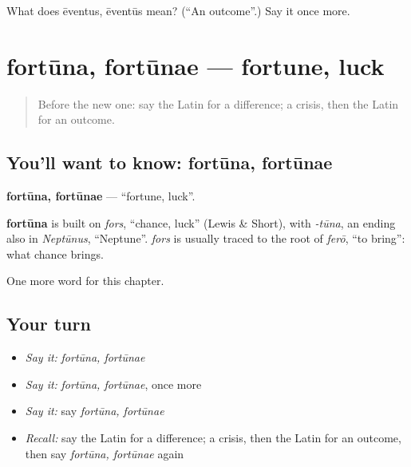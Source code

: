 \begin{tcolorbox}[breakable,colback=teal!4,colframe=teal!35!black,title={Before you move on}]
What does ēventus, ēventūs mean? (\textquotedblleft{}An outcome\textquotedblright{}.) Say it once more.
\end{tcolorbox}
\section[fortūna, fortūnae]{fortūna, fortūnae — fortune, luck}

\label{lesson:LA-C221-fortuna}



\begin{quote}
Before the new one: say the Latin for a difference; a crisis, then the Latin for an outcome.
\end{quote}

\subsection*{You'll want to know: fortūna, fortūnae}
\textbf{fortūna, fortūnae} — \textquotedblleft{}fortune, luck\textquotedblright{}.

\begin{cousinweb}
\textbf{fortūna} is built on \emph{fors}, \textquotedblleft{}chance, luck\textquotedblright{} (Lewis \& Short), with \emph{-tūna}, an ending also in \emph{Neptūnus}, \textquotedblleft{}Neptune\textquotedblright{}. \emph{fors} is usually traced to the root of \emph{ferō}, \textquotedblleft{}to bring\textquotedblright{}: what chance brings.
\end{cousinweb}

\begin{grammarlens}[title={What you've built}]
One more word for this chapter.
\end{grammarlens}

\subsection*{Your turn}
\begin{itemize}
\raggedright
  \item \emph{Say it:} \emph{fortūna, fortūnae}
  \item \emph{Say it:} \emph{fortūna, fortūnae}, once more
  \item \emph{Say it:} say \emph{fortūna, fortūnae}
  \item \emph{Recall:} say the Latin for a difference; a crisis, then the Latin for an outcome, then say \emph{fortūna, fortūnae} again
\end{itemize}


